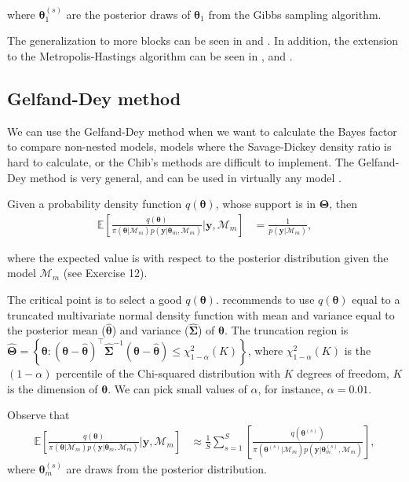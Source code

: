 where $\bm{\theta}^{(s)}_1$ are the posterior draws of $\bm{\theta}_1$ from the Gibbs sampling algorithm. 

The generalization to more blocks can be seen in \cite{chib1995marginal} and \cite[Chap.~7]{greenberg2012introduction}. In addition, the extension to the Metropolis-Hastings algorithm can be seen in \cite{chib2001marginal}, and \cite[Chap.~7]{greenberg2012introduction}.

\subsection{Gelfand-Dey method}\label{sec10_4_3}
We can use the Gelfand-Dey method \cite{gelfand1994bayesian} when we want to calculate the Bayes factor to compare non-nested models, models where the Savage-Dickey density ratio is hard to calculate, or the Chib's methods are difficult to implement. The Gelfand-Dey method is very general, and can be used in virtually any model \cite[Chap.~5]{koop2003bayesian}.

Given a probability density function $q(\bm{\theta})$, whose support is in $\bm{\Theta}$, then
\begin{align*}
	\mathbb{E}\left[\frac{q(\bm{\theta})}{\pi(\bm{\theta}|\mathcal{M}_m)p(\bm{y}|\bm{\theta}_m,\mathcal{M}_m)}\biggr\rvert \bm{y},\mathcal{M}_m\right]&=\frac{1}{p(\bm{y}|\mathcal{M}_m)},
\end{align*} 

where the expected value is with respect to the posterior distribution given the model $\mathcal{M}_m$ (see Exercise 12).

The critical point is to select a good $q(\bm{\theta})$. \cite{geweke1999using} recommends to use $q(\bm{\theta})$ equal to a truncated multivariate normal density function with mean and variance equal to the posterior mean ($\hat{\bm{\theta}}$) and variance ($\hat{\bm{\Sigma}}$) of $\bm{\theta}$. The truncation region is $\hat{\bm{\Theta}}=\left\{\bm{\theta}:(\bm{\theta}-\hat{\bm{\theta}})^{\top}\hat{\bm{\Sigma}}^{-1}(\bm{\theta}-\hat{\bm{\theta}})\leq \chi_{1-\alpha}^2(K)\right\}$, where $\chi_{1-\alpha}^2(K)$ is the $(1-\alpha)$ percentile of the Chi-squared distribution with $K$ degrees of freedom, $K$ is the dimension of $\bm{\theta}$. We can pick small values of $\alpha$, for instance, $\alpha=0.01$.

Observe that 
\begin{align*}
	\mathbb{E}\left[\frac{q(\bm{\theta})}{\pi(\bm{\theta}|\mathcal{M}_m)p(\bm{y}|\bm{\theta}_m,\mathcal{M}_m)}\biggr\rvert \bm{y},\mathcal{M}_m\right]&\approx \frac{1}{S}\sum_{s=1}^S \left[\frac{q(\bm{\theta}^{(s)})}{\pi(\bm{\theta}^{(s)}|\mathcal{M}_m)p(\bm{y}|\bm{\theta}^{(s)}_m,\mathcal{M}_m)}\right],
\end{align*}
where $\bm{\theta}^{(s)}_m$ are draws from the posterior distribution.

